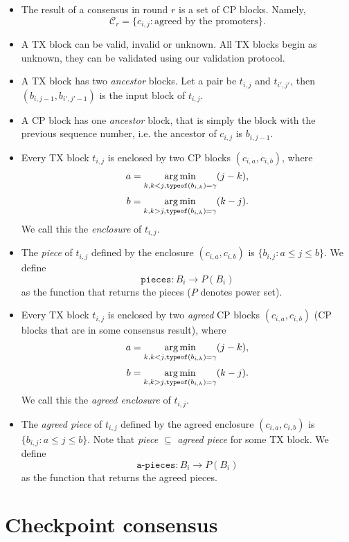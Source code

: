 \begin{itemize}
\item The result of a consensus in round $r$ is a set of CP blocks. Namely,
  $$\mathcal{C}_r = \{ c_{i,j} : \text{agreed by the promoters}\}.$$

\item A TX block can be valid, invalid or unknown. All TX blocks begin as
  unknown, they can be validated using our validation protocol.

\item A TX block has two \emph{ancestor} blocks. Let a pair be $t_{i,j}$ and
  $t_{i',j'}$, then $(b_{i, j-1}, b_{i', j'-1})$ is the input block of $t_{i,j}$.

\item A CP block has one \emph{ancestor} block, that is simply the block with
  the previous sequence number, i.e. the ancestor of $c_{i,j}$ is $b_{i,j-1}$.

\item Every TX block $t_{i,j}$ is enclosed by two CP blocks $(c_{i,a},
  c_{i,b})$, where
  $$a = \operatorname*{arg\,min}_{k, k < j, \texttt{typeof}(b_{i,k}) = \gamma}(j - k),$$
  $$b = \operatorname*{arg\,min}_{k, k > j, \texttt{typeof}(b_{i,k}) = \gamma}(k - j).$$
  We call this the \emph{enclosure} of $t_{i,j}$.

\item The \emph{piece} of $t_{i,j}$ defined by the enclosure $(c_{i,a},
  c_{i,b})$ is $\{b_{i,j} : a \le j \le b\}$.
  We define
  $$ \texttt{pieces}: B_i \rightarrow P(B_i) $$
  as the function that returns the pieces ($P$ denotes power set).

\item Every TX block $t_{i,j}$ is enclosed by two \emph{agreed} CP blocks
  $(c_{i,a}, c_{i,b})$ (CP blocks that are in some consensus result), where
  $$a = \operatorname*{arg\,min}_{k, k < j, \texttt{typeof}(b_{i,k}) = \gamma}(j - k),$$
  $$b = \operatorname*{arg\,min}_{k, k > j, \texttt{typeof}(b_{i,k}) = \gamma}(k - j).$$
  We call this the \emph{agreed enclosure} of $t_{i,j}$.

\item The \emph{agreed piece} of $t_{i,j}$ defined by the agreed enclosure
  $(c_{i,a}, c_{i,b})$ is $\{b_{i,j} : a \le j \le b\}$. Note that \emph{piece}
  $\subseteq$ \emph{agreed piece} for some TX block.
  We define
  $$ \texttt{a-pieces}: B_i \rightarrow P(B_i) $$
  as the function that returns the agreed pieces.

\end{itemize}

\section{Checkpoint consensus}

